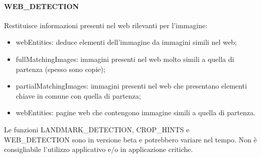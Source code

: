 \paragraph{\textsf{WEB\_DETECTION}} Restituisce informazioni presenti nel web rilevanti per l'immagine:
\begin{itemize}
\item \textsf{webEntities}: deduce elementi dell'immagine da immagini simili nel web;
\item \textsf{fullMatchingImages}: immagini presenti nel web molto simili a quella di partenza (spesso sono copie);
\item \textsf{partialMatchingImages}: immagini presenti nel web che presentano elementi chiave in comune con quella di partenza;
\item \textsf{webEntities}: pagine web che contengono immagine simili a quella di partenza.
\end{itemize}
%
Le funzioni \textsf{LANDMARK\_DETECTION}, \textsf{CROP\_HINTS} e \textsf{WEB\_DETECTION} sono in versione beta e potrebbero variare nel tempo.
Non è consigliabile l'utilizzo applicativo e/o in applicazione critiche.
%
